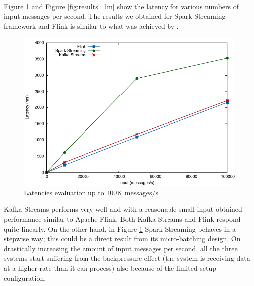 \paragraph{}
Figure \ref{fig:results_100k} and Figure \ref{fig:results_1m} show the latency for various numbers of input messages per second. The results we obtained for Spark Streaming framework and Flink is similar to what was achieved by \cite{yahoobenchmarkingonline, zalandobenchmarkingonline}.

 \begin{figure}[h!]
\includegraphics[width=1\textwidth]{images/engines_100k_cropped.pdf}
 \caption{Latencies evaluation up to 100K messages/s}
\label{fig:results_100k}
\end{figure}

 Kafka Streams performs very well and with a reasonable small input obtained performance similar to Apache Flink. Both Kafka Streams and Flink respond quite linearly. On the other hand, in Figure \ref{fig:results_100k} Spark Streaming behaves in a stepwise way; this could be a direct result from its micro-batching design. On drastically increasing the amount of input messages per second, all the three systems start suffering from the backpressure effect (the system is receiving data at a higher rate than it can process) also because of the limited setup configuration.
 
